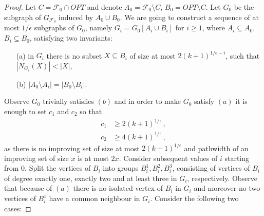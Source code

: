 \documentclass[11pt]{article}
\theoremstyle{definition}
\newcommand{\cF}{{\mathcal{F}}}
\newcommand{\writeref}[1]{\immediate\write\tempfile{\unexpanded{#1}}}
\renewcommand{\ref}[1]{\oldref{#1}\writeref{\oldref{#1} (#1)}\writeref{}}
\begin{document}
\begin{proof}
Let $C = \cF_0 \cap OPT$ and denote $A_0 = \cF_0 \setminus C$, $B_0 = OPT \setminus C$.
Let $G_0$ be the subgraph of $G_{\cF_0}$ induced by $A_0 \cup B_0$.
We are going to construct a sequence of at most $1/\epsilon$ subgraphs of $G_0$,
namely $G_i = G_0[A_i \cup B_i]$ for $i \ge 1$, where $A_i \subseteq A_0$, $B_i \subseteq B_0$, 
satisfying two invariants:
\begin{itemize}
 \item[(a)] in $G_i$ there is no subset $X \subseteq B_i$ of size at most $2(k+1)^{1/\epsilon - i}$, such that $|N_{G_i}(X)| < |X|$,
 \item[(b)] $|A_0 \setminus A_i| = |B_0 \setminus B_i|$.
\end{itemize}
Observe $G_0$ trivially satisfies $(b)$
and in order to make $G_0$ satisfy $(a)$ 
it is enough to set $c_1$ and $c_2$ so that
\begin{align*}
c_1 & \ge 2(k+1)^{1/\epsilon}\,, \\
c_2 & \ge 4(k+1)^{1/\epsilon}\,,
\end{align*}
as there is no improving set of size at most $2(k+1)^{1/\epsilon}$
and pathwidth of an improving set of size $x$ is at most $2x$.
Consider subsequent values of $i$ starting from $0$.
Split the vertices of $B_i$ into groups $B_i^1, B_i^2, B_i^3$, 
consisting of vertices of $B_i$ of degree exactly one, exactly two and at least three in $G_i$, respectively.
Observe that because of $(a)$ there is no isolated vertex of $B_i$ in $G_i$
and moreover no two vertices of $B_i^1$ have a common neighbour in $G_i$.
Consider the following two cases:
\end{proof}
\end{document}
